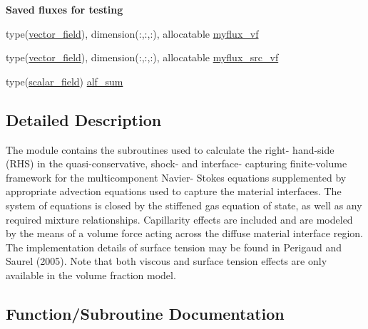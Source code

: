 \begin{Indent}\textbf{ Saved fluxes for testing}\par
\begin{DoxyCompactItemize}
\item 
type(\hyperlink{structm__derived__types_1_1vector__field}{vector\+\_\+field}), dimension(\+:,\+:,\+:), allocatable \hyperlink{namespacem__rhs_a32b605d9d7c6a2dd06b13df3beb0b4ce}{myflux\+\_\+vf}
\item 
type(\hyperlink{structm__derived__types_1_1vector__field}{vector\+\_\+field}), dimension(\+:,\+:,\+:), allocatable \hyperlink{namespacem__rhs_affa0b502273a1db4307c4c7d36a088e7}{myflux\+\_\+src\+\_\+vf}
\item 
type(\hyperlink{structm__derived__types_1_1scalar__field}{scalar\+\_\+field}) \hyperlink{namespacem__rhs_aaaecb99341e4534ec839e9356bf90536}{alf\+\_\+sum}
\end{DoxyCompactItemize}
\end{Indent}


\subsection{Detailed Description}
The module contains the subroutines used to calculate the right-\/ hand-\/side (R\+HS) in the quasi-\/conservative, shock-\/ and interface-\/ capturing finite-\/volume framework for the multicomponent Navier-\/ Stokes equations supplemented by appropriate advection equations used to capture the material interfaces. The system of equations is closed by the stiffened gas equation of state, as well as any required mixture relationships. Capillarity effects are included and are modeled by the means of a volume force acting across the diffuse material interface region. The implementation details of surface tension may be found in Perigaud and Saurel (2005). Note that both viscous and surface tension effects are only available in the volume fraction model. 

\subsection{Function/\+Subroutine Documentation}
\mbox{\label{namespacem__rhs_a87bc24802f4abe7b3cb36864d631a275}} 
